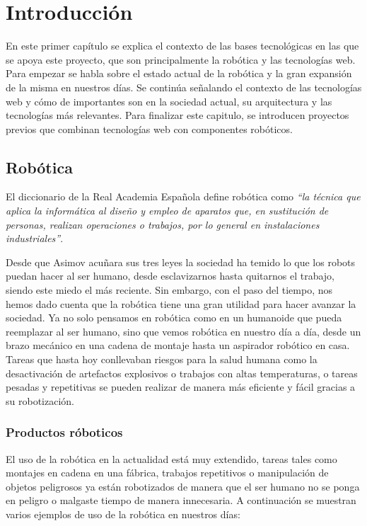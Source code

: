 \chapter{Introducción}\label{cap.introduccion}
En este primer capítulo se explica el contexto de las bases tecnológicas en las que se apoya este proyecto, que son principalmente la robótica y las tecnologías web. Para empezar se habla sobre el estado actual de la robótica y la gran expansión de la misma en nuestros días. Se continúa señalando el contexto de las tecnologías web y cómo de importantes son en la sociedad actual, su arquitectura y las tecnologías más relevantes. Para finalizar este capitulo, se introducen proyectos previos que combinan tecnologías web con componentes robóticos.

\section{Robótica}
El diccionario de la Real Academia Española define robótica como \textit{``la técnica que aplica la informática al diseño y empleo de aparatos que, en sustitución de personas, realizan operaciones o trabajos, por lo general en instalaciones industriales''}. 

Desde que Asimov acuñara sus tres leyes la sociedad ha temido lo que los robots puedan hacer al ser humano, desde esclavizarnos hasta quitarnos el trabajo, siendo este miedo el más reciente. Sin embargo, con el paso del tiempo, nos hemos dado cuenta que la robótica tiene una gran utilidad para hacer avanzar la sociedad. Ya no solo pensamos en robótica como en un humanoide que pueda reemplazar al ser humano, sino que vemos robótica en nuestro día a día, desde un brazo mecánico en una cadena de montaje hasta un aspirador robótico en casa. Tareas que hasta hoy conllevaban riesgos para la salud humana como la desactivación de artefactos explosivos o trabajos con altas temperaturas, o tareas pesadas y repetitivas se pueden realizar de manera más eficiente y fácil gracias a su robotización.

\subsection{Productos róboticos}
El uso de la robótica en la actualidad está muy extendido, tareas tales como montajes en cadena en una fábrica, trabajos repetitivos o manipulación de objetos peligrosos ya están robotizados de manera que el ser humano no se ponga en peligro o malgaste tiempo de manera innecesaria. A continuación se muestran varios ejemplos de uso de la robótica en nuestros días:

